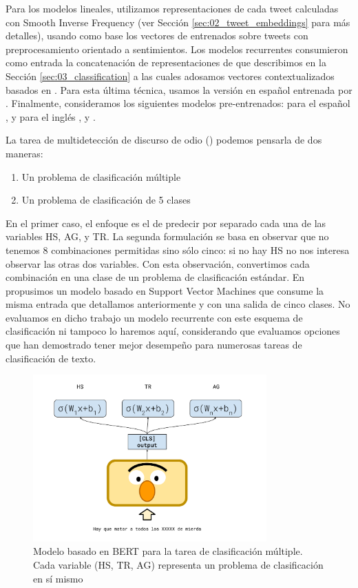 Para los modelos lineales, utilizamos representaciones de cada tweet calculadas con Smooth Inverse Frequency (ver Sección \ref{sec:02_tweet_embeddings} para más detalles), usando como base los vectores de \fasttext{} entrenados sobre tweets con preprocesamiento orientado a sentimientos. Los modelos recurrentes consumieron como entrada la concatenación de representaciones de \fasttext{} que describimos en la Sección \ref{sec:03_classification} a las cuales adosamos vectores contextualizados basados en \elmo{}. \cite{peters2018} Para esta última técnica, usamos la versión en español entrenada por \citet{che-EtAl:2018:K18-2}. Finalmente, consideramos los siguientes modelos pre-entrenados: para el español \beto{} \cite{canete2020spanish}, y para el inglés \bert{} \cite{devlin2018bert}, \roberta{} \cite{liu2019roberta} y \bertweet{}. \cite{dat2020bertweet}

La tarea de multidetección de discurso de odio (\subtaskb{}) podemos pensarla de dos maneras:

\begin{enumerate}
    \item Un problema de clasificación múltiple
    \item Un problema de clasificación de 5 clases
\end{enumerate}

En el primer caso, el enfoque es el de predecir por separado cada una de las variables HS, AG, y TR. La segunda formulación se basa en observar que no tenemos 8 combinaciones permitidas sino sólo cinco: si no hay HS no nos interesa observar las otras dos variables. Con esta observación, convertimos cada combinación en una clase de un problema de clasificación estándar. En \citet{perez-2019-atalaya} propusimos un modelo basado en Support Vector Machines que consume la misma entrada que detallamos anteriormente y con una salida de cinco clases. No evaluamos en dicho trabajo un modelo recurrente con este esquema de clasificación ni tampoco lo haremos aquí, considerando que evaluamos opciones que han demostrado tener mejor desempeño para numerosas tareas de clasificación de texto.

\begin{figure}
    \centering
    \includegraphics[width=0.8\textwidth]{img/05/bert_model_hateval.pdf}
    \caption{Modelo basado en BERT para la tarea de clasificación múltiple. Cada variable (HS, TR, AG) representa un problema de clasificación en sí mismo}
    \label{fig:bert_hateval_classifier}
\end{figure}


